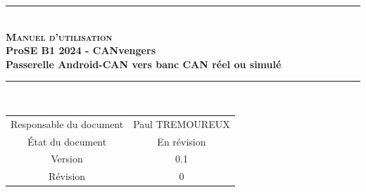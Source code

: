 \documentclass[a4paper,11pt,titlepage,french]{article}
\newcommand{\version}{0.1}
\newcommand{\revision}{0}
\newcommand{\documentName}{Manuel d'utilisation}
\newcommand{\prose}{ProSE}
\newcommand{\creator}{Paul TREMOUREUX}
\newcommand{\projectName}{Passerelle Android-CAN vers banc CAN réel ou simulé}
\newcommand{\annee}{2024}
\newcommand{\teamName}{CANvengers}
\newcommand{\teamNumber}{B1}
\begin{document}
\makeatother
\begin{center} %
    \vspace*{2cm} %
    \rule[0.5ex]{0.7\textwidth}{0.1mm}\\ %
    \vspace*{2mm} %
        {\Huge {\textsc{\bf {\documentName}}}} %
    \vspace{0.4cm}\\ %
        {\large\bf {\prose} {\teamNumber} {\annee} - {\teamName}}\\ %
    \vspace*{1mm}
        {\large\bf {\projectName}}\\ %
    \rule[0.5ex]{0.75\textwidth}{0.1mm}\\ %
    \vspace{2cm} 
    \begin{tabular}{|c|c|} %
        \hline %
            Responsable du document & {\creator}                      \\
            État du document        & En révision                     \\
            Version                 & {\version}                      \\
            Révision                & {\revision}                     \\
        \hline
    \end{tabular}
\end{center}
\vspace{3cm} 
 


\tableofcontents %
\end{document}
